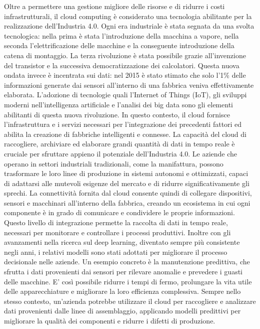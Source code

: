 Oltre a permettere una gestione migliore delle risorse e di ridurre i costi infrastrutturali, il cloud computing è considerato una tecnologia abilitante per la realizzazione dell’Industria 4.0. Ogni era industriale è stata segnata da una svolta tecnologica: nella prima è stata l'introduzione della macchina a vapore, nella seconda l'elettrificazione delle macchine e la conseguente introduzione della catena di montaggio. La terza rivoluzione è stata possibile grazie all'invenzione del transistor e la successiva democratizzazione dei calcolatori. Questa nuova ondata invece è incentrata sui dati: nel 2015 è stato stimato che solo l'1\% delle informazioni generate dai sensori all'interno di una fabbrica veniva effettivamente elaborata. L’adozione di tecnologie quali l’Internet of Things (IoT), gli sviluppi moderni nell'intelligenza artificiale e l’analisi dei big data sono gli elementi abilitanti di questa nuova rivoluzione. In questo contesto, il cloud fornisce l'infrastruttura e i servizi necessari per l'integrazione dei precedenti fattori ed abilita la creazione di fabbriche intelligenti e connesse. La capacità del cloud di raccogliere, archiviare ed elaborare grandi quantità di dati in tempo reale è cruciale per sfruttare appieno il potenziale dell’Industria 4.0. Le aziende che operano in settori industriali tradizionali, come la manifattura, possono trasformare le loro linee di produzione in sistemi autonomi e ottimizzati, capaci di adattarsi alle mutevoli esigenze del mercato e di ridurre significativamente gli sprechi. La connettività fornita dal cloud consente quindi di collegare dispositivi, sensori e macchinari all'interno della fabbrica, creando un ecosistema in cui ogni componente è in grado di comunicare e condividere le proprie informazioni. Questo livello di integrazione permette la raccolta di dati in tempo reale, necessari per monitorare e controllare i processi produttivi. Inoltre con gli avanzamenti nella ricerca sul deep learning, diventato sempre più consistente negli anni, i relativi modelli sono stati adottati per migliorare il processo decisionale nelle aziende. Un esempio concreto è la manutenzione predittiva, che sfrutta i dati provenienti dai sensori per rilevare anomalie e prevedere i guasti delle macchine. E' così possibile ridurre i tempi di fermo, prolungare la vita utile delle apparecchiature e migliorare la loro efficienza complessiva. Sempre nello stesso contesto, un'azienda potrebbe utilizzare il cloud per raccogliere e analizzare dati provenienti dalle linee di assemblaggio, applicando modelli predittivi per migliorare la qualità dei componenti e ridurre i difetti di produzione.

